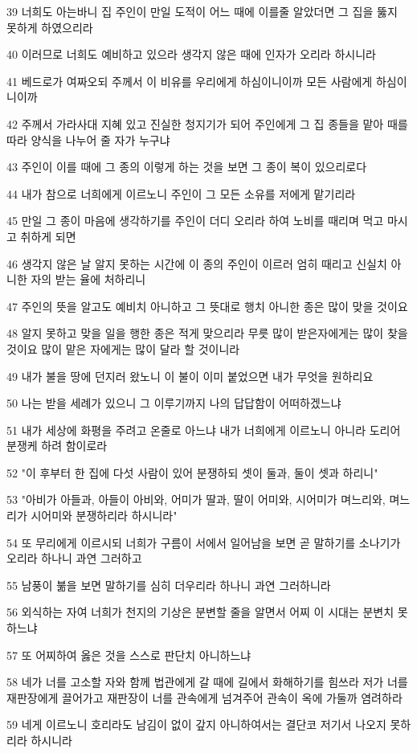 \par 39 너희도 아는바니 집 주인이 만일 도적이 어느 때에 이를줄 알았더면 그 집을 뚫지 못하게 하였으리라
\par 40 이러므로 너희도 예비하고 있으라 생각지 않은 때에 인자가 오리라 하시니라
\par 41 베드로가 여짜오되 주께서 이 비유를 우리에게 하심이니이까 모든 사람에게 하심이니이까
\par 42 주께서 가라사대 지혜 있고 진실한 청지기가 되어 주인에게 그 집 종들을 맡아 때를 따라 양식을 나누어 줄 자가 누구냐
\par 43 주인이 이를 때에 그 종의 이렇게 하는 것을 보면 그 종이 복이 있으리로다
\par 44 내가 참으로 너희에게 이르노니 주인이 그 모든 소유를 저에게 맡기리라
\par 45 만일 그 종이 마음에 생각하기를 주인이 더디 오리라 하여 노비를 때리며 먹고 마시고 취하게 되면
\par 46 생각지 않은 날 알지 못하는 시간에 이 종의 주인이 이르러 엄히 때리고 신실치 아니한 자의 받는 율에 처하리니
\par 47 주인의 뜻을 알고도 예비치 아니하고 그 뜻대로 행치 아니한 종은 많이 맞을 것이요
\par 48 알지 못하고 맞을 일을 행한 종은 적게 맞으리라 무릇 많이 받은자에게는 많이 찾을 것이요 많이 맡은 자에게는 많이 달라 할 것이니라
\par 49 내가 불을 땅에 던지러 왔노니 이 불이 이미 붙었으면 내가 무엇을 원하리요
\par 50 나는 받을 세례가 있으니 그 이루기까지 나의 답답함이 어떠하겠느냐
\par 51 내가 세상에 화평을 주려고 온줄로 아느냐 내가 너희에게 이르노니 아니라 도리어 분쟁케 하려 함이로라
\par 52 "이 후부터 한 집에 다섯 사람이 있어 분쟁하되 셋이 둘과, 둘이 셋과 하리니"
\par 53 "아비가 아들과, 아들이 아비와, 어미가 딸과, 딸이 어미와, 시어미가 며느리와, 며느리가 시어미와 분쟁하리라 하시니라"
\par 54 또 무리에게 이르시되 너희가 구름이 서에서 일어남을 보면 곧 말하기를 소나기가 오리라 하나니 과연 그러하고
\par 55 남풍이 붊을 보면 말하기를 심히 더우리라 하나니 과연 그러하니라
\par 56 외식하는 자여 너희가 천지의 기상은 분변할 줄을 알면서 어찌 이 시대는 분변치 못하느냐
\par 57 또 어찌하여 옳은 것을 스스로 판단치 아니하느냐
\par 58 네가 너를 고소할 자와 함께 법관에게 갈 때에 길에서 화해하기를 힘쓰라 저가 너를 재판장에게 끌어가고 재판장이 너를 관속에게 넘겨주어 관속이 옥에 가둘까 염려하라
\par 59 네게 이르노니 호리라도 남김이 없이 갚지 아니하여서는 결단코 저기서 나오지 못하리라 하시니라

